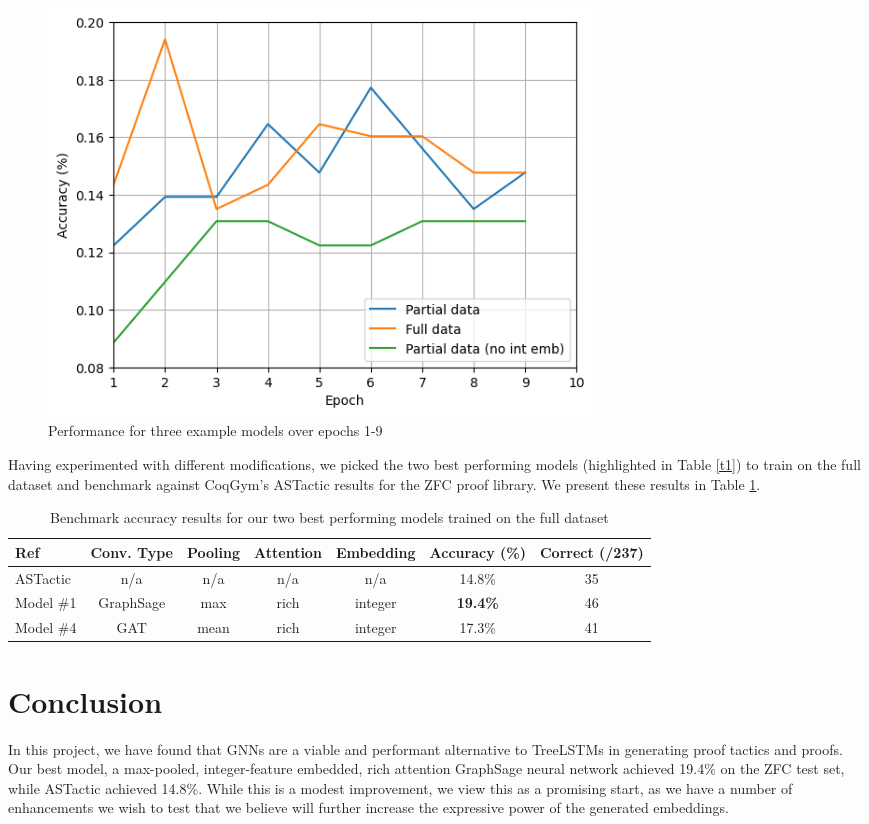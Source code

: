 \documentclass{article}
\begin{document}
\begin{figure}[H]
    \centering
    \includegraphics[width=0.7\textwidth]{images/int-emb-GraphSage-max.png}
    \caption{Performance for three example models over epochs 1-9}
    \label{fig:epochs}
\end{figure}

Having experimented with different modifications, we picked the two best performing models (highlighted in Table \ref{t1}) to train on the full dataset and benchmark against CoqGym's ASTactic results for the ZFC proof library. We present these results in Table \ref{t2}.
\begin{table}[h]
\begin{tabular}{lcccccc}
\hline
Ref       & Conv. Type & Pooling & Attention & Embedding & Accuracy (\%) & Correct (/237) \\ \hline
ASTactic  & n/a        & n/a     & n/a       & n/a       & 14.8\%        & 35             \\
Model \#1 & GraphSage  & max     & rich      & integer   & \textbf{19.4\% }       & 46     \\
Model \#4 & GAT        & mean    & rich      & integer   & 17.3\%        & 41             \\ \hline
\end{tabular}
\caption{Benchmark accuracy results for our two best performing models trained on the full dataset}
\label{t2}
\end{table}

\section{Conclusion}
In this project, we have found that GNNs are a viable and performant alternative to TreeLSTMs in generating proof tactics and proofs. Our best model, a max-pooled, integer-feature embedded, rich attention GraphSage neural network achieved 19.4\% on the ZFC test set, while ASTactic achieved 14.8\%. While this is a modest improvement, we view this as a promising start, as we have a number of enhancements we wish to test that we believe will further increase the expressive power of the generated embeddings.
\end{document}
